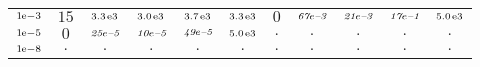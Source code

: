 \begin{tiny}
\begin{tabular}{@{$\;$}c@{$\;$}|@{$\;$}c@{$\;$}@{$\;$}c@{$\;$}@{$\;$}c@{$\;$}@{$\;$}c@{$\;$}@{$\;$}c@{$\;$}|@{$\;$}c@{$\;$}@{$\;$}c@{$\;$}@{$\;$}c@{$\;$}@{$\;$}c@{$\;$}@{$\;$}c@{$\;$}}
$\scriptstyle1\!\mathrm{\hspace{0.10em}e}-3$ & $\scriptstyle15$ & $\scriptstyle3.3\mathrm{\hspace{0.10em}e}3$ & $\scriptstyle3.0\mathrm{\hspace{0.10em}e}3$ & $\scriptstyle3.7\mathrm{\hspace{0.10em}e}3$ & $\scriptstyle3.3\mathrm{\hspace{0.10em}e}3$ & $\scriptstyle0$ & $\scriptstyle\textit{67}\hspace{0.00em}e\textit{--3}$ & $\scriptstyle\textit{21}\hspace{0.00em}e\textit{--3}$ & $\scriptstyle\textit{17}\hspace{0.00em}e\textit{--1}$ & $\scriptstyle5.0\mathrm{\hspace{0.10em}e}3$\\ 
$\scriptstyle1\!\mathrm{\hspace{0.10em}e}-5$ & $\scriptstyle0$ & $\scriptstyle\textit{25}\hspace{0.00em}e\textit{--5}$ & $\scriptstyle\textit{10}\hspace{0.00em}e\textit{--5}$ & $\scriptstyle\textit{49}\hspace{0.00em}e\textit{--5}$ & $\scriptstyle5.0\mathrm{\hspace{0.10em}e}3$ & $\scriptstyle.$ & $\scriptstyle.$ & $\scriptstyle.$ & $\scriptstyle.$ & $\scriptstyle.$\\ 
$\scriptstyle1\!\mathrm{\hspace{0.10em}e}-8$ & $\scriptstyle.$ & $\scriptstyle.$ & $\scriptstyle.$ & $\scriptstyle.$ & $\scriptstyle.$ & $\scriptstyle.$ & $\scriptstyle.$ & $\scriptstyle.$ & $\scriptstyle.$ & $\scriptstyle.$\\ 
\end{tabular} 
\end{tiny} 
